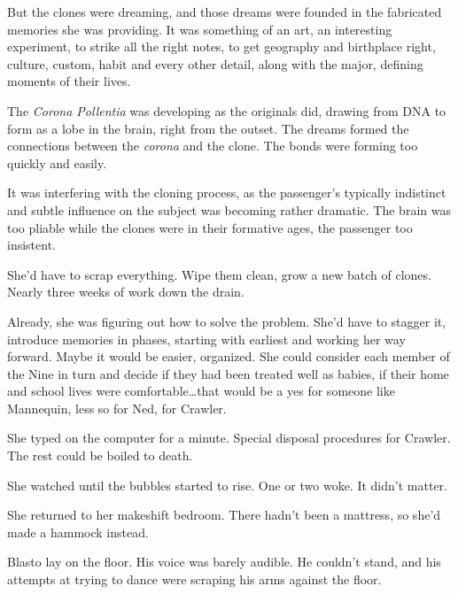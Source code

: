 But the clones were dreaming, and those dreams were founded in the fabricated memories she was providing.  It was something of an art, an interesting experiment, to strike all the right notes, to get geography and birthplace right, culture, custom, habit and every other detail, along with the major, defining moments of their lives.



The \emph{Corona Pollentia} was developing as the originals did, drawing from DNA to form as a lobe in the brain, right from the outset.  The dreams formed the connections between the \emph{corona} and the clone.  The bonds were forming too quickly and easily.



It was interfering with the cloning process, as the passenger's typically indistinct and subtle influence on the subject was becoming rather dramatic.  The brain was too pliable while the clones were in their formative ages, the passenger too insistent.



She'd have to scrap everything.  Wipe them clean, grow a new batch of clones.  Nearly three weeks of work down the drain.



Already, she was figuring out how to solve the problem.  She'd have to stagger it, introduce memories in phases, starting with earliest and working her way forward.  Maybe it would be easier, organized.  She could consider each member of the Nine in turn and decide if they had been treated well as babies, if their home and school lives were comfortable\ldots that would be a yes for someone like Mannequin, less so for Ned, for Crawler.



She typed on the computer for a minute.  Special disposal procedures for Crawler.  The rest could be boiled to death.



She watched until the bubbles started to rise.  One or two woke.  It didn't matter.



She returned to her makeshift bedroom.  There hadn't been a mattress, so she'd made a hammock instead.



Blasto lay on the floor.  His voice was barely audible.  He couldn't stand, and his attempts at trying to dance were scraping his arms against the floor.



